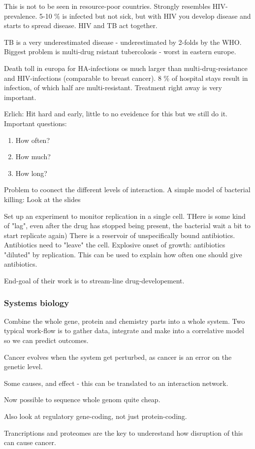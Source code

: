 \documentclass[12p]{article}
\begin{document}
This is not to be seen in resource-poor countries. 
Strongly resembles HIV-prevalence. 
5-10 \% is infected but not sick, but with HIV you develop disease and starts to spread disease.
HIV and TB act together.

TB is a very underestimated disease - underestimated by 2-folds by the WHO.
Biggest problem is multi-drug rsistant tubercolosis - worst in eastern europe. 

Death toll in europa for HA-infections os much larger than multi-drug-resistance and HIV-infections (comparable to breast cancer).
8 \% of hospital stays result in infection, of which half are multi-resistant.
Treatment right away is very important.

Erlich: Hit hard and early, little to no eveidence for this but we still do it.
Important questions: 

\begin{enumerate}
    \item
	How often?
    \item
	How much?
    \item
	How long?
\end{enumerate}

Problem to coonect the different levels of interaction.
A simple model of bacterial killing: Look at the slides

Set up an experiment to monitor replication in a single cell.
THere is some kind of "lag", even after the drug has stopped being present, the bacterial wait a bit to start replicate again)
There is a reservoir of unspecifically bound antibiotics.
Antibiotics need to "leave" the cell.
Explosive onset of growth: antibiotics "diluted" by replication.
This can be used to explain how often one should give antibiotics.

End-goal of their work is to stream-line drug-developement.

\subsubsection{Systems biology}

Combine the whole gene, protein and chemistry parts into a whole system.
Two typical work-flow is to gather data, integrate and make into a correlative model so we can predict outcomes.

Cancer evolves when the system get perturbed, as cancer is an error on the genetic level.

Some causes, and effect - this can be translated to an interaction network.

Now possible to sequence whole genom quite cheap.

Also look at regulatory gene-coding, not just protein-coding.

Trancriptions and proteomes are the key to underestand how disruption of this can cause cancer.
\end{document}

